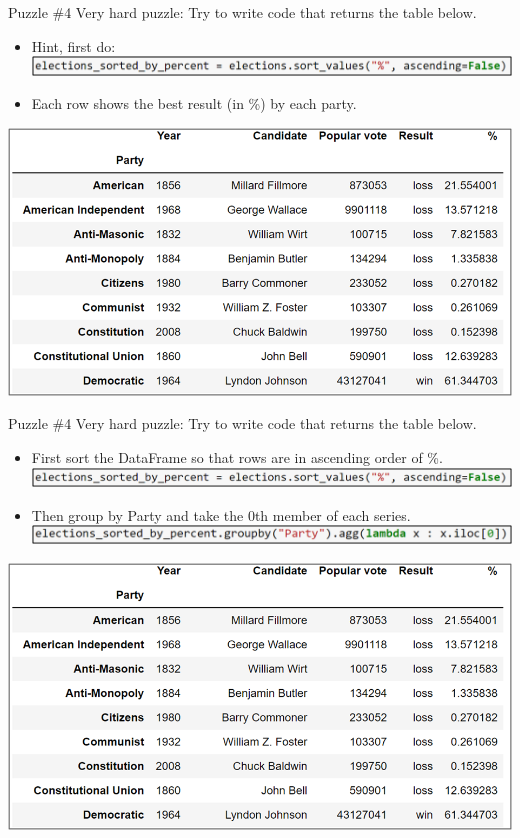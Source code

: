 \documentclass[aspectratio=169]{../latex_main/tntbeamer}  %
\begin{document}
    \begin{frame}{ Puzzle \#4}
        Very hard puzzle: Try to write code that returns the table below.
        \begin{itemize}
            \item Hint, first do:  \includegraphics[scale=.7]{Bild30}
            \item Each row shows the best result (in \%) by each party.
        \end{itemize}
        \centering
        \includegraphics[scale=.56]{Bild29}
    \end{frame}
    
    
    
    \begin{frame}{ Puzzle \#4}
        Very hard puzzle: Try to write code that returns the table below.
        \begin{itemize}
            \item First sort the DataFrame so that rows are in ascending order of \%. \includegraphics[scale=.7]{Bild30}
            \item Then group by Party and take the 0th member of each series. \includegraphics[scale=.7]{Bild31}

        \end{itemize}
        \hfill
        \includegraphics[scale=.45]{Bild29}
    \end{frame}
    
\end{document}
